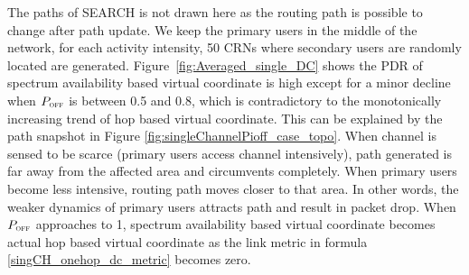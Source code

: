 %
The paths of SEARCH is not drawn here as the routing path is possible to change after path update.
We keep the primary users in the middle of the network, for each activity intensity, 50 CRNs where secondary users are randomly located are generated.
Figure~\ref{fig:Averaged_single_DC} shows the PDR of spectrum availability based virtual coordinate is high except for a minor decline when $P_{\textsc{\tiny OFF}}$ is between 0.5 and 0.8, which is contradictory to the monotonically increasing trend of hop based virtual coordinate. This can be explained by the path snapshot in Figure \ref{fig:singleChannelPioff_case_topo}. 
When channel is sensed to be scarce (primary users access channel intensively), path generated is far away from the affected area and circumvents completely.
When primary users become less intensive, routing path moves closer to that area.
In other words, the weaker dynamics of primary users attracts path and result in packet drop.
When $P_{\textsc{\tiny OFF}}$ approaches to 1, spectrum availability based virtual coordinate becomes actual hop based virtual coordinate as the link metric in formula \ref{singCH_onehop_dc_metric} becomes zero.


